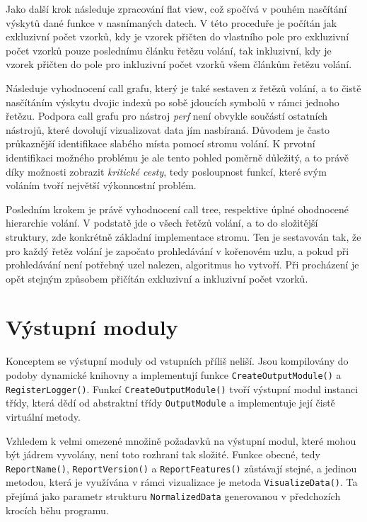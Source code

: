 \documentclass[czech,BP]{thesiskiv}
\begin{document}
Jako další krok následuje zpracování flat view, což spočívá v pouhém nasčítání výskytů dané funkce v nasnímaných datech. V této proceduře je počítán jak exkluzivní počet vzorků, kdy je vzorek přičten do vlastního pole pro exkluzivní počet vzorků pouze poslednímu článku řetězu volání, tak inkluzivní, kdy je vzorek přičten do pole pro inkluzivní počet vzorků všem článkům řetězu volání.

Následuje vyhodnocení call grafu, který je také sestaven z řetězů volání, a to čistě nasčítáním výskytu dvojic indexů po sobě jdoucích symbolů v rámci jednoho řetězu. Podpora call grafu pro nástroj \emph{perf} není obvykle součástí ostatních nástrojů, které dovolují vizualizovat data jím nasbíraná. Důvodem je často průkaznější identifikace slabého místa pomocí stromu volání. K prvotní identifikaci možného problému je ale tento pohled poměrně důležitý, a to právě díky možnosti zobrazit \emph{kritické cesty}, tedy posloupnost funkcí, které svým voláním tvoří největší výkonnostní problém.

Posledním krokem je právě vyhodnocení call tree, respektive úplné ohodnocené hierarchie volání. V podstatě jde o  všech řetězů volání, a to do složitější struktury, zde konkrétně základní implementace stromu. Ten je sestavován tak, že pro každý řetěz volání je započato prohledávání v kořenovém uzlu, a pokud při prohledávání není potřebný uzel nalezen, algoritmus ho vytvoří. Při procházení je opět stejným způsobem přičítán exkluzivní a inkluzivní počet vzorků.


\section{Výstupní moduly}

Konceptem se výstupní moduly od vstupních příliš neliší. Jsou kompilovány do podoby dynamické knihovny a implementují funkce \texttt{CreateOutputModule()} a \texttt{RegisterLogger()}. Funkcí \texttt{CreateOutputModule()} tvoří výstupní modul instanci třídy, která dědí od abstraktní třídy \texttt{OutputModule} a implementuje její čistě virtuální metody.

Vzhledem k velmi omezené množině požadavků na výstupní modul, které mohou být jádrem vyvolány, není toto rozhraní tak složité. Funkce obecné, tedy \texttt{ReportName()}, \texttt{ReportVersion()} a \texttt{ReportFeatures()} zůstávají stejné, a jedinou metodou, která je využívána v rámci vizualizace je metoda \texttt{VisualizeData()}. Ta přejímá jako parametr strukturu \texttt{NormalizedData} generovanou v předchozích krocích běhu programu.
\end{document}
